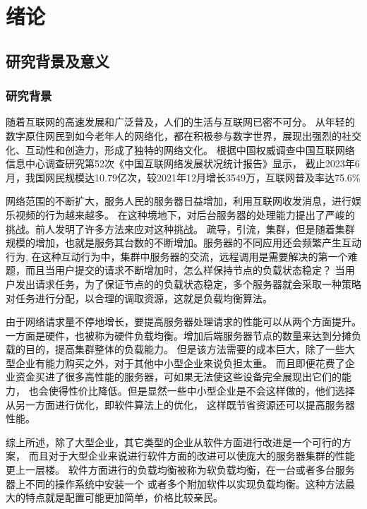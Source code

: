 \chapter{绪论}

\section{研究背景及意义}

\subsection{研究背景}

随着互联网的高速发展和广泛普及，人们的生活与互联网已密不可分。
从年轻的数字原住网民到如今老年人的网络化，都在积极参与数字世界，展现出强烈的社交化、互动性和创造力，形成了独特的网络文化。
根据中国权威调查中国互联网络信息中心调查研究第52次《中国互联网络发展状况统计报告》显示，
截止2023年6月，我国网民规模达10.79亿次，较2021年12月增长3549万，互联网普及率达75.6\%\cite{vsgohulmwhlofavjvlkltsjibcgc}

网络范围的不断扩大，服务人民的服务器日益增加，利用互联网收发消息，进行娱乐视频的行为越来越多。
在这种境地下，对后台服务器的处理能力提出了严峻的挑战。前人发明了许多方法来应对这种挑战。
疏导，引流，集群，但是随着集群规模的增加，也就是服务其台数的不断增加。服务器的不同应用还会频繁产生互动行为,
在这种互动行为中，集群中服务器的交流，远程调用是需要解决的第一个难题，而且当用户提交的请求不断增加时，怎么样保持节点的负载状态稳定？
当用户发出请求任务，为了保证节点的的负载状态稳定，多个服务器就会采取一种策略对任务进行分配，以合理的调取资源，这就是负载均衡算法。

由于网络请求量不停地增长，要提高服务器处理请求的性能可以从两个方面提升。
一方面是硬件，也被称为硬件负载均衡。增加后端服务器节点的数量来达到分摊负载的目的，提高集群整体的负载能力。
但是该方法需要的成本巨大，除了一些大型企业有能力购买之外，对于其他中小型企业来说负担太重。
而且即便花费了企业资金买进了很多高性能的服务器，可如果无法使这些设备完全展现出它们的能力，
也会使得性价比降低。但是显然一些中小型企业是不会这样做的，他们选择从另一方面进行优化，即软件算法上的优化，
这样既节省资源还可以提高服务器性能。\cite{qbee}

综上所述，除了大型企业，其它类型的企业从软件方面进行改进是一个可行的方案，
而且对于大型企业来说进行软件方面的改进可以使庞大的服务器集群的性能更上一层楼。
软件方面进行的负载均衡被称为软负载均衡，在一台或者多台服务器上不同的操作系统中安装一个
或者多个附加软件以实现负载均衡。这种方法最大的特点就是配置可能更加简单，价格比较亲民。

